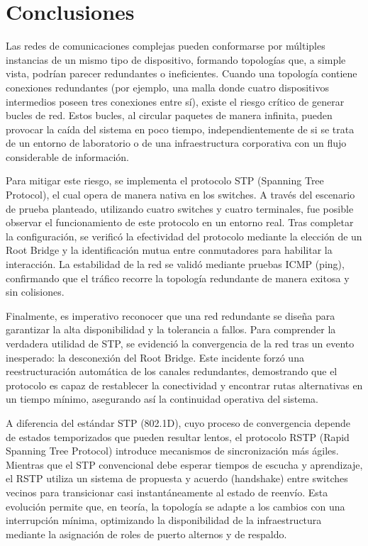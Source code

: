 
\section{Conclusiones}
Las redes de comunicaciones complejas pueden conformarse por múltiples instancias de un
mismo tipo de dispositivo, formando topologías que, a simple vista, podrían parecer
redundantes o ineficientes. Cuando una topología contiene conexiones redundantes (por
ejemplo, una malla donde cuatro dispositivos intermedios poseen tres conexiones entre
sí), existe el riesgo crítico de generar bucles de red. Estos bucles, al circular
paquetes de manera infinita, pueden provocar la caída del sistema en poco tiempo,
independientemente de si se trata de un entorno de laboratorio o de una infraestructura
corporativa con un flujo considerable de información.

Para mitigar este riesgo, se implementa el protocolo STP (Spanning Tree Protocol), el
cual opera de manera nativa en los switches. A través del escenario de prueba
planteado, utilizando cuatro switches y cuatro terminales, fue posible observar el
funcionamiento de este protocolo en un entorno real. Tras completar la configuración,
se verificó la efectividad del protocolo mediante la elección de un Root Bridge y la
identificación mutua entre conmutadores para habilitar la interacción. La estabilidad
de la red se validó mediante pruebas ICMP (ping), confirmando que el tráfico recorre la
topología redundante de manera exitosa y sin colisiones.

Finalmente, es imperativo reconocer que una red redundante se diseña para garantizar la
alta disponibilidad y la tolerancia a fallos. Para comprender la verdadera utilidad de
STP, se evidenció la convergencia de la red tras un evento inesperado: la desconexión
del Root Bridge. Este incidente forzó una reestructuración automática de los canales
redundantes, demostrando que el protocolo es capaz de restablecer la conectividad y
encontrar rutas alternativas en un tiempo mínimo, asegurando así la continuidad
operativa del sistema.

A diferencia del estándar STP (802.1D), cuyo proceso de convergencia depende de estados
temporizados que pueden resultar lentos, el protocolo RSTP (Rapid Spanning Tree
Protocol) introduce mecanismos de sincronización más ágiles. Mientras que el STP
convencional debe esperar tiempos de escucha y aprendizaje, el RSTP utiliza un sistema
de propuesta y acuerdo (handshake) entre switches vecinos para transicionar casi
instantáneamente al estado de reenvío. Esta evolución permite que, en teoría, la
topología se adapte a los cambios con una interrupción mínima, optimizando la
disponibilidad de la infraestructura mediante la asignación de roles de puerto alternos
y de respaldo.

